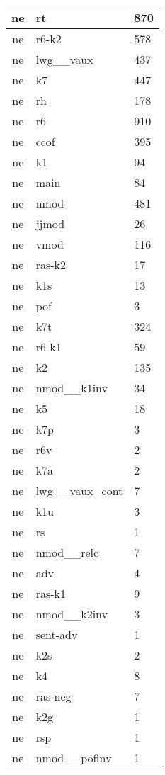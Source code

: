 \documentclass[a4 paper]{article}
\begin{document}
\begin{longtable}{cp{}p{}}
ne & rt & 870\\ \midrule ne & r6-k2 & 578\\ \midrule ne & lwg\_\_vaux & 437\\ \midrule ne & k7 & 447\\ \midrule ne & rh & 178\\ \midrule ne & r6 & 910\\ \midrule ne & ccof & 395\\ \midrule ne & k1 & 94\\ \midrule ne & main & 84\\ \midrule ne & nmod & 481\\ \midrule ne & jjmod & 26\\ \midrule ne & vmod & 116\\ \midrule ne & ras-k2 & 17\\ \midrule ne & k1s & 13\\ \midrule ne & pof & 3\\ \midrule ne & k7t & 324\\ \midrule ne & r6-k1 & 59\\ \midrule ne & k2 & 135\\ \midrule ne & nmod\_\_k1inv & 34\\ \midrule ne & k5 & 18\\ \midrule ne & k7p & 3\\ \midrule ne & r6v & 2\\ \midrule ne & k7a & 2\\ \midrule ne & lwg\_\_vaux\_cont & 7\\ \midrule ne & k1u & 3\\ \midrule ne & rs & 1\\ \midrule ne & nmod\_\_relc & 7\\ \midrule ne & adv & 4\\ \midrule ne & ras-k1 & 9\\ \midrule ne & nmod\_\_k2inv & 3\\ \midrule ne & sent-adv & 1\\ \midrule ne & k2s & 2\\ \midrule ne & k4 & 8\\ \midrule ne & ras-neg & 7\\ \midrule ne & k2g & 1\\ \midrule ne & rsp & 1\\ \midrule ne & nmod\_\_pofinv & 1\\ \midrule 

\end{longtable}
\end{document}
